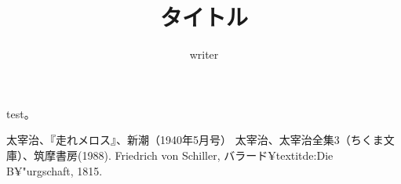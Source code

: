 \documentclass[dvipdfmx,titlepage,11pt, a4paper]{jsarticle}%
\title{タイトル}
\author{writer}
\begin{document}
\maketitle

\section{}
\newpage
\section{}
\newpage
\section{}
\newpage
\section{}
\newpage
\section{}
test\cite{sincho}\cite[第3章127ページ]{chikuma}。
\begin{thebibliography}{99}
     太宰治、『走れメロス』、新潮（1940年5月号）
     太宰治、太宰治全集3（ちくま文庫）、筑摩書房(1988).
     Friedrich von Schiller, バラード¥textit{de:Die B¥"{u}rgschaft}, 1815.
\end{thebibliography}
\end{document}

